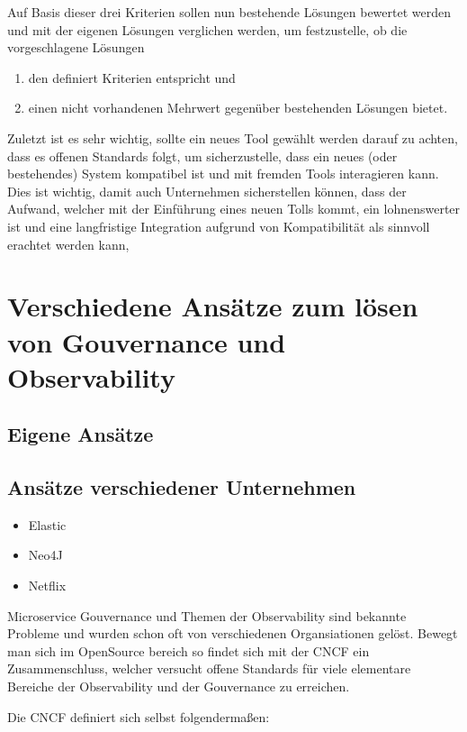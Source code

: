 \documentclass[
	12pt,
	BCOR=5mm,
	DIV=12,
	headinclude=on,
	footinclude=off,
	parskip=half,
	bibliography=totoc,
	listof=entryprefix,
	toc=listof,
	numbers=noenddot,
	plainfootsepline
]{scrreprt}
\begin{document}
Auf Basis dieser drei Kriterien sollen nun bestehende Lösungen bewertet werden und mit der eigenen Lösungen verglichen werden, um festzustelle, ob die vorgeschlagene Lösungen
\begin{enumerate}
	\item den definiert Kriterien entspricht und
	\item einen nicht vorhandenen Mehrwert gegenüber bestehenden Lösungen bietet.
\end{enumerate}

Zuletzt ist es sehr wichtig, sollte ein neues Tool gewählt werden darauf zu achten, dass es offenen Standards folgt, um sicherzustelle, dass ein neues (oder bestehendes) System kompatibel ist und mit fremden Tools interagieren kann. Dies ist wichtig, damit auch Unternehmen sicherstellen können, dass der Aufwand, welcher mit der Einführung eines neuen Tolls kommt, ein lohnenswerter ist und eine langfristige Integration aufgrund von Kompatibilität als sinnvoll erachtet werden kann,

\section{Verschiedene Ansätze zum lösen von Gouvernance und Observability}
\subsection{Eigene Ansätze}
\subsection{Ansätze verschiedener Unternehmen}
\begin{itemize}
	\item Elastic 
	\item Neo4J 
	\item Netflix 
\end{itemize}
Microservice Gouvernance und Themen der Observability sind bekannte Probleme und wurden schon oft von verschiedenen Organsiationen gelöst. Bewegt man sich im OpenSource bereich so findet sich mit der \ac{CNCF} ein Zusammenschluss, welcher versucht offene Standards für viele elementare Bereiche der Observability und der Gouvernance zu erreichen.

Die \ac{CNCF} definiert sich selbst folgendermaßen:
\end{document}
